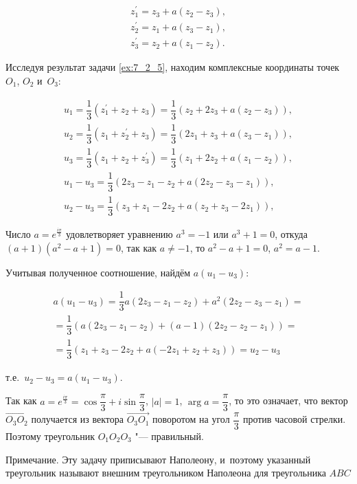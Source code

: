 \begin{gather*}
	z^\prime_{1} = z_{3} + a(z_{2} - z_{3}), \\
	z^\prime_{2} = z_{1} + a(z_{3} - z_{1}), \\
	z^\prime_{3} = z_{2} + a(z_{1} - z_{2}).
\end{gather*}

Исследуя результат задачи \ref{ex:7_2_5}, находим комплексные координаты
точек $O_{1}$, $O_{2}$ и~$O_{3}$: 

\begin{gather*}
	u_{1} = \dfrac{1}{3}(z^\prime_{1} + z_{2} + z_{3}) = 
		\dfrac{1}{3}\left( z_{2} + 2z_{3} + a(z_{2} - z_{3}) \right), \\
	u_{2} = \dfrac{1}{3}(z_{1} + z^\prime_{2} + z_{3}) = 
		\dfrac{1}{3}\left( 2z_{1} + z_{3} + a(z_{3} - z_{1}) \right), \\
	u_{3} = \dfrac{1}{3}(z_{1} + z_{2} + z^\prime_{3}) = 
		\dfrac{1}{3}\left( z_{1} + 2z_{2} + a(z_{1} - z_{2}) \right), \\
	u_{1} - u_{3} = \dfrac{1}{3}\left( 2z_{3} - z_{1} - z_{2} +  
		a(2z_{2} - z_{3} - z_{1}) \right), \\
	u_{2} - u_{3} = \dfrac{1}{3}\left( z_{3} + z_{1} - 2z_{2} +  
		a(z_{2} + z_{3} - 2z_{1}) \right),
\end{gather*}

Число $a = e^{\frac{i\pi}{3}}$ удовлетворяет уравнению $a^{3} = -1$ или
$a^{3} + 1 = 0$, откуда $(a + 1)(a^{2} - a+ 1) = 0$, так как $a \ne -1$,
то $a^{2} - a + 1 = 0$, $a^{2} = a - 1$.

Учитывая полученное соотношение, найдём $a(u_{1} - u_{3})$:

\begin{multline*}
	a(u_{1} - u_{3}) =
	\dfrac{1}{3}a(2z_{3} - z_{1} -z_{2}) + a^{2}(2z_{2} - z_{3} - z_{1}) = \\
  =	\dfrac{1}{3}
	\left( a(2z_{3} - z_{1} - z_{2}) + (a-1)(2z_{2} - z_{2} - z_{1}) \right) = \\
	= \dfrac{1}{3}
	\left( z_{1} + z_{3} - 2z_{2} + a(-2z_{1} + z_{2} + z_{3}) \right) =
	u_{2} - u_{3}
\end{multline*}

\noindent
т.е.\ $u_{2} - u_{3} = a(u_{1} - u_{3})$.

Так как $a = e^{\frac{i\pi}{3}} = \cos \dfrac{\pi}{3} + i\sin \dfrac{\pi}{3}$,
$|a| = 1$, $\arg a = \dfrac{\pi}{3}$, то это означает, что вектор 
$\overrightarrow{O_{3}O_{2}}$ получается из вектора
$\overrightarrow{O_{3}O_{1}}$ поворотом на угол $\dfrac{\pi}{3}$ против
часовой стрелки. Поэтому треугольник $O_{1}O_{2}O_{3}$ "--- правильный.

Примечание. Эту задачу приписывают Наполеону, и~поэтому указанный треугольник
называют внешним треугольником Наполеона для треугольника $ABC$

